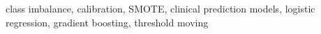 class imbalance, calibration, SMOTE, clinical prediction models, logistic regression, gradient boosting, threshold moving
